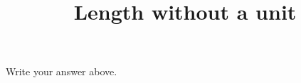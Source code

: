 \documentclass{handout}
\title{Length without a unit}
\begin{document}
\maketitle
{}
Write your answer above.
\end{document}
